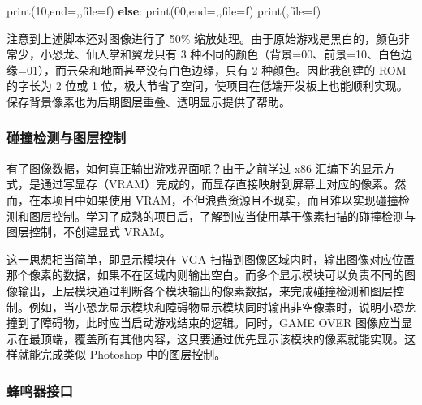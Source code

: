 \documentclass[hyperref,UTF8,12pt,a4paper]{ctexart}
\newenvironment{Shaded}{}{}
\newcommand{\BuiltInTok}[1]{#1}
\newcommand{\ControlFlowTok}[1]{\textcolor[rgb]{0.00,0.44,0.13}{\textbf{#1}}}
\newcommand{\NormalTok}[1]{#1}
\newcommand{\OperatorTok}[1]{\textcolor[rgb]{0.40,0.40,0.40}{#1}}
\newcommand{\StringTok}[1]{\textcolor[rgb]{0.25,0.44,0.63}{#1}}
\begin{document}
\begin{Shaded}
\begin{Highlighting}[]
                \BuiltInTok{print}\NormalTok{(}\StringTok{\textquotesingle{}10\textquotesingle{}}\NormalTok{,end}\OperatorTok{=}\StringTok{\textquotesingle{},\textquotesingle{}}\NormalTok{,}\BuiltInTok{file}\OperatorTok{=}\NormalTok{f)}
            \ControlFlowTok{else}\NormalTok{:}
                \BuiltInTok{print}\NormalTok{(}\StringTok{\textquotesingle{}00\textquotesingle{}}\NormalTok{,end}\OperatorTok{=}\StringTok{\textquotesingle{},\textquotesingle{}}\NormalTok{,}\BuiltInTok{file}\OperatorTok{=}\NormalTok{f)}
        \BuiltInTok{print}\NormalTok{(}\StringTok{\textquotesingle{}\textquotesingle{}}\NormalTok{,}\BuiltInTok{file}\OperatorTok{=}\NormalTok{f)}
\end{Highlighting}
\end{Shaded}

注意到上述脚本还对图像进行了 50\%
缩放处理。由于原始游戏是黑白的，颜色非常少，小恐龙、仙人掌和翼龙只有 3
种不同的颜色（背景=00、前景=10、白色边缘=01），而云朵和地面甚至没有白色边缘，只有
2 种颜色。因此我创建的 ROM 的字长为 2 位或 1
位，极大节省了空间，使项目在低端开发板上也能顺利实现。保存背景像素也为后期图层重叠、透明显示提供了帮助。

\hypertarget{ux78b0ux649eux68c0ux6d4bux4e0eux56feux5c42ux63a7ux5236}{%
\subsubsection{碰撞检测与图层控制}\label{ux78b0ux649eux68c0ux6d4bux4e0eux56feux5c42ux63a7ux5236}}

有了图像数据，如何真正输出游戏界面呢？由于之前学过 x86
汇编下的显示方式，是通过写显存（VRAM）完成的，而显存直接映射到屏幕上对应的像素。然而，在本项目中如果使用
VRAM，不但浪费资源且不现实，而且难以实现碰撞检测和图层控制。学习了成熟的项目后，了解到应当使用基于像素扫描的碰撞检测与图层控制，不创建显式
VRAM。

这一思想相当简单，即显示模块在 VGA
扫描到图像区域内时，输出图像对应位置那个像素的数据，如果不在区域内则输出空白。而多个显示模块可以负责不同的图像输出，上层模块通过判断各个模块输出的像素数据，来完成碰撞检测和图层控制。例如，当小恐龙显示模块和障碍物显示模块同时输出非空像素时，说明小恐龙撞到了障碍物，此时应当启动游戏结束的逻辑。同时，GAME
OVER
图像应当显示在最顶端，覆盖所有其他内容，这只要通过优先显示该模块的像素就能实现。这样就能完成类似
Photoshop 中的图层控制。

\hypertarget{buzzer}{%
\subsubsection{蜂鸣器接口}\label{buzzer}}
\end{document}
